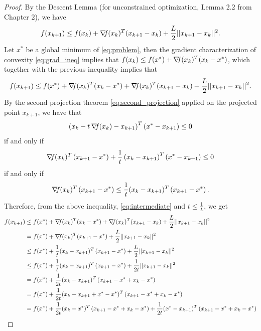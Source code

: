 \documentclass[10pt,a4paper]{article}
\begin{document}
\begin{proof}
	By the Descent Lemma (for unconstrained optimization, Lemma 2.2 from Chapter 2), we have 
	\begin{equation*}
		f(x_{k+1}) \leq f(x_k)+\operatorname*{\mathit{\nabla \!f}}(x_k)^T(x_{k+1}-x_k) +\frac{L}{2}||x_{k+1}-x_k||^2.
	\end{equation*}
Let $x^*$ be a global minimum of \eqref{eq:problem}, then the gradient characterization of convexity \eqref{eq:grad_ineq} implies that $f(x_k)\leq f(x^*)+\operatorname*{\mathit{\nabla \!f}}(x_k)^T(x_k-x^*)$, which together with the previous inequality implies that
\begin{equation}\label{eq:intermediate}
	f(x_{k+1}) \leq f(x^*)+\operatorname*{\mathit{\nabla \!f}}(x_k)^T(x_k-x^*)+\operatorname*{\mathit{\nabla \!f}}(x_k)^T(x_{k+1}-x_k) +\frac{L}{2}||x_{k+1}-x_k||^2.
\end{equation}
By the second projection theorem \eqref{eq:second_projection} applied on the projected point $x_{k+1}$, we have that 
\begin{equation*}
\left(x_k -t\operatorname*{\mathit{\nabla \!f}}(x_k) -x_{k+1}\right)^T\left(x^*-x_{k+1}\right)\leq 0
\end{equation*}
if and only if
\begin{equation*}
\operatorname*{\mathit{\nabla \!f}}(x_k)^T\left(x_{k+1}-x^*\right)+ \frac{1}{t}\left(x_k -x_{k+1}\right)^T\left(x^*-x_{k+1}\right)\leq0
\end{equation*}
if and only if
\begin{equation*}
	\operatorname*{\mathit{\nabla \!f}}(x_k)^T\left(x_{k+1}-x^*\right) \leq \frac{1}{t}(x_k-x_{k+1})^T\left(x_{k+1}-x^*\right).
\end{equation*}
Therefore, from the above inequality, \eqref{eq:intermediate} and $t\leq \frac{1}{L}$, we get
\begin{equation*}
	\begin{split}
		f(x_{k+1}) &\leq f(x^*)+\grad(x_k)^T(x_k-x^*)+\grad(x_k)^T(x_{k+1}-x_k) +\frac{L}{2}||x_{k+1}-x_k||^2\\
		& = f(x^*)+\grad(x_k)^T(x_{k+1}-x^*) +\frac{L}{2}||x_{k+1}-x_k||^2\\
		&\leq f(x^*)+\frac{1}{t}(x_k-x_{k+1})^T\left(x_{k+1}-x^*\right)+\frac{L}{2}||x_{k+1}-x_k||^2\\
		&\leq f(x^*)+\frac{1}{t}(x_k-x_{k+1})^T\left(x_{k+1}-x^*\right)+\frac{1}{2t}||x_{k+1}-x_k||^2\\
		&= f(x^*)+\frac{1}{2t}(x_k-x_{k+1})^T\left(x_{k+1}-x^*+x_k - x^*\right)\\
		&= f(x^*)+\frac{1}{2t}(x_k-x_{k+1}+x^*-x^*)^T\left(x_{k+1}-x^*+x_k - x^*\right)\\
		&= f(x^*)+\frac{1}{2t}(x_k-x^*)^T\left(x_{k+1}-x^*+x_k - x^*\right) + \frac{1}{2t}(x^*-x_{k+1})^T\left(x_{k+1}-x^*+x_k - x^*\right)\\

\end{split}
\end{equation*}
\end{proof}
\end{document}
